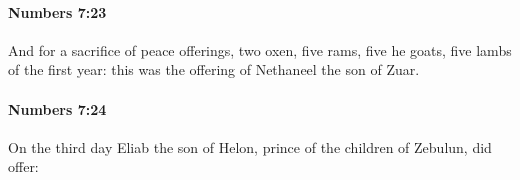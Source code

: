 		\paragraph{Numbers 7:23} %
			\label{NUMBERS-7-23}

			And for a sacrifice of peace offerings, two oxen, five rams, five he goats, five lambs of the first year: this was the offering of Nethaneel the son of Zuar.


		\paragraph{Numbers 7:24} %
			\label{NUMBERS-7-24}

			On the third day Eliab the son of Helon, prince of the children of Zebulun, did offer:


